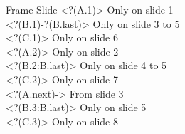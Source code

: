 \documentclass {beamer}
\begin{document}
\begin{frame}
  {\Large Frame \insertframenumber}
  {\Large Slide \insertslidenumber}
\visible<?(A.1)> {Only on slide 1}\\
\visible<?(B.1)-?(B.last)> {Only on slide 3 to 5}\\
\visible<?(C.1)> {Only on slide 6}\\
\visible<?(A.2)> {Only on slide 2}\\
\visible<?(B.2:B.last)> {Only on slide 4 to 5}\\
\visible<?(C.2)> {Only on slide 7}\\
\visible<?(A.next)-> {From slide 3}\\
\visible<?(B.3:B.last)> {Only on slide 5}\\
\visible<?(C.3)> {Only on slide 8}\\
\end{frame}
\end{document}
